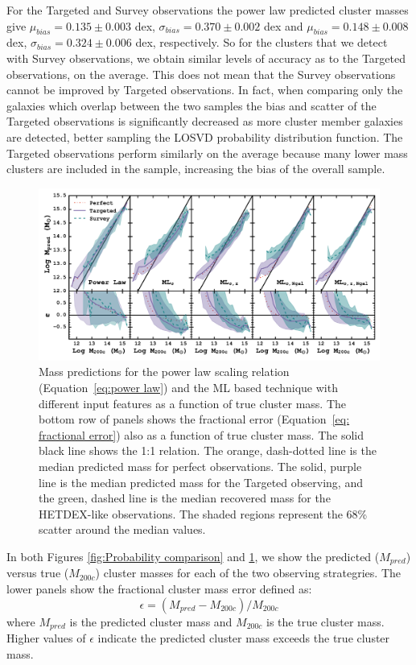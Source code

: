 \documentclass[fleqn,usenatbib]{mnras}
\begin{document}
For the Targeted and Survey observations the power law predicted cluster masses give $\mu_{bias} =0.135\pm{0.003}$ dex, $\sigma_{bias} = 0.370\pm{0.002}$ dex and $\mu_{bias} =0.148\pm{0.008}$ dex, $\sigma_{bias} = 0.324\pm{0.006}$ dex, respectively. So for the clusters that we detect with Survey observations, we obtain similar levels of accuracy as to the Targeted observations, on the average. This does not mean that the Survey observations cannot be improved by Targeted observations. In fact, when comparing only the galaxies which overlap between the two samples the bias and scatter of the Targeted observations is significantly decreased as more cluster member galaxies are detected, better sampling the LOSVD probability distribution function. The Targeted observations perform similarly on the average because many lower mass clusters are included in the sample, increasing the bias of the overall sample.

\begin{figure} 
	\includegraphics[width=\textwidth]{figures/MLcomparison.pdf} 
	\caption[ML based cluster mass predictions]{Mass predictions for the power law scaling relation (Equation~\ref{eq:power law}) and the ML based technique with different input features as a function of true cluster mass. The bottom row of panels shows the fractional error (Equation~\ref{eq: fractional error}) also as a function of true cluster mass. The solid black line shows the 1:1 relation. The orange, dash-dotted line is the median predicted mass for perfect observations. The solid, purple line is the median predicted mass for the Targeted observing, and the green, dashed line is the median recovered mass for the HETDEX-like observations. The shaded regions represent the 68\% scatter around the median values.}
	\label{fig: ML comparison} 
\end{figure}

In both Figures \ref{fig:Probability comparison} and \ref{fig: ML comparison}, we show the predicted ($M_{pred}$) versus true ($M_{200c}$) cluster masses for each of the two observing strategries. The lower panels show the fractional cluster mass error defined as: 
\begin{equation}\label{eq: fractional error}
	\epsilon = (M_{pred} - M_{200c})/M_{200c}
\end{equation}
where $M_{pred}$ is the predicted cluster mass and $M_{200c}$ is the true cluster mass. Higher values of $\epsilon$ indicate the predicted cluster mass exceeds the true cluster mass.
\end{document}
